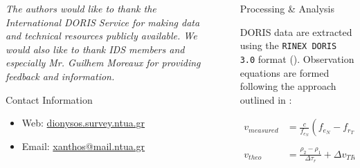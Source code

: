 \documentclass[final,a0,portrait]{beamer}
\newlength{\sepwid}
\newlength{\onecolwid}
\begin{document}
\begin{frame}[t]
\begin{columns}[t]
\begin{column}{\onecolwid}
\par\textit{\footnotesize The authors would like to thank the International DORIS 
Service for making data and technical resources publicly available. We would also 
like to thank IDS members and especially Mr. Guilhem Moreaux for providing 
feedback and information.}

\begin{alertblock}{Contact Information}
\begin{itemize}
\item Web: \href{http://dionysos.survey.ntua.gr}{dionysos.survey.ntua.gr}
\item Email: \href{xanthos@mail.ntua.gr}{xanthos@mail.ntua.gr}
\end{itemize}
\end{alertblock}




\end{column} %

\begin{column}{\sepwid}\end{column}

\begin{column}{\onecolwid} 


\begin{block}{Processing \& Analysis}

{\small
DORIS data are extracted using the \texttt{RINEX DORIS 3.0} format 
(\cite{DORISRNX3}). Observation equations are formed following the approach 
outlined in \cite{lemoine-2016}:

\begin{subequations} \label{eq:lem13}
    \begin{align}
        v_{measured} & = \frac{c}{f_{e_N}} (f_{e_N} - f_{r_T} -
          \frac{N_{DOP}}{\Delta\tau_r}) + \Delta v_{REL} + 
          \Delta v_{IONO} \label{eq:lem13a} \\
        v_{theo} &= \frac{\rho_2 - \rho_1}{\Delta\tau_r} +
          \Delta v_{TROPO} - \frac{c(\frac{N_{DOP}}{\Delta\tau_r} + 
          f_{r_T})}{f_{e_N}} \frac{\Delta f_e}{f_{e_N}} \label{eq:lem13b}
    \end{align}
\end{subequations}

}
\end{block}
\end{column}
\end{columns}
\end{frame}
\end{document}

